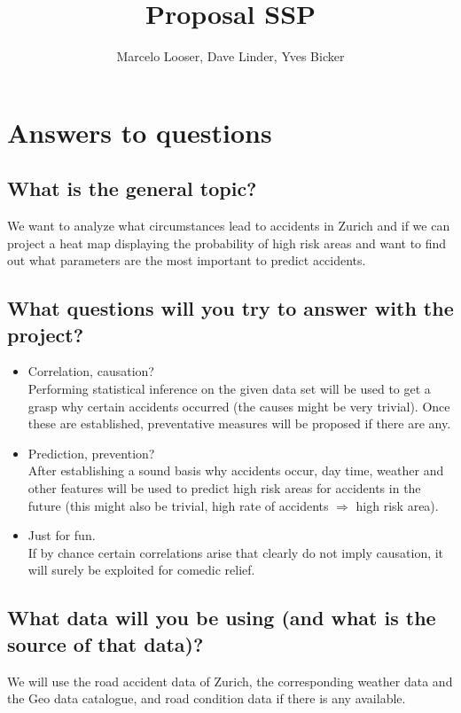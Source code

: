 \documentclass{article}
\title{Proposal SSP}
\author{Marcelo Looser, Dave Linder, Yves Bicker}
\begin{document}
\maketitle

\section{Answers to questions}

\subsection{What is the general topic?}
We want to analyze what circumstances lead to accidents in Zurich and if we can project a heat map displaying the probability of high risk areas and want to find out what parameters are the most important to predict accidents.    
\subsection{What questions will you try to answer with the project?}
\begin{itemize}
    \item Correlation, causation?\vspace{0.2cm}\\
     Performing statistical inference on the given data set will be used to get a grasp why certain accidents occurred (the causes might be very trivial). Once these are established, preventative measures will be proposed if there are any. 
     
    \item Prediction, prevention? \vspace{0.2cm}\\
    After establishing a sound basis why accidents occur, day time, weather and other features will be used to predict high risk areas for accidents in the future (this might also be trivial, high rate of accidents $\Rightarrow$ high risk area). 
    
    \item Just for fun. \vspace{0.2cm}\\
    If by chance certain correlations arise that clearly do not imply causation, it will surely be exploited for comedic relief.  
\end{itemize}

\subsection{What data will you be using (and what is the source of that data)?}
We will use the road accident data of Zurich, the corresponding weather data and the Geo data catalogue, and road condition data if there is any available.
\end{document}

